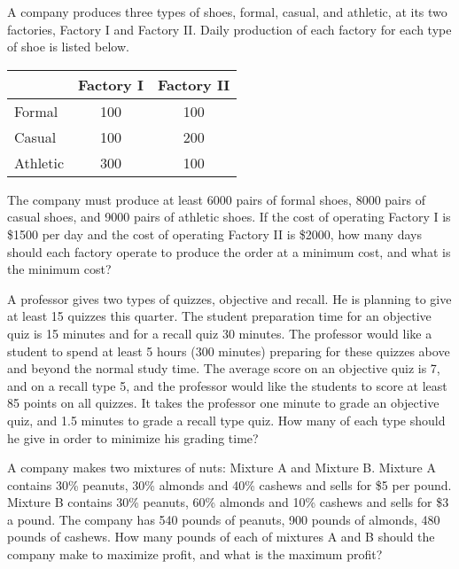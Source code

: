 \begin{puzzle}
    A company produces three types of shoes, formal, casual, and athletic, at its two factories, Factory I and Factory II. Daily production of each factory for each type of shoe is listed below.
    \begin{center}
        \begin{tabular}{|l|c|c|}
            \hline
                     & Factory I & Factory II \\
            \hline
            Formal   & 100       & 100        \\
            \hline
            Casual   & 100       & 200        \\
            \hline
            Athletic & 300       & 100        \\
            \hline
        \end{tabular}

    \end{center}
    The company must produce at least 6000 pairs of formal shoes, 8000 pairs of casual shoes, and 9000 pairs of athletic shoes. If the cost of operating Factory I is \$1500 per day and the cost of operating Factory II is \$2000, how many days should each factory operate to produce the order at a minimum cost, and what is the minimum cost?
\end{puzzle}

\begin{puzzle}
    A professor gives two types of quizzes, objective and recall. He is planning to give at least 15
    quizzes this quarter. The student preparation time for an objective quiz is 15 minutes and for a
    recall quiz 30 minutes. The professor would like a student to spend at least 5 hours (300 minutes)
    preparing for these quizzes above and beyond the normal study time. The average score on an
    objective quiz is 7, and on a recall type 5, and the professor would like the students to score at
    least 85 points on all quizzes. It takes the professor one minute to grade an objective quiz, and 1.5
    minutes to grade a recall type quiz. How many of each type should he give in order to minimize
    his grading time?
\end{puzzle}

\begin{puzzle}
    A company makes two mixtures of nuts: Mixture A and Mixture B. Mixture A contains 30\%
    peanuts, 30\% almonds and 40\% cashews and sells for \$5 per pound. Mixture B contains 30\%
    peanuts, 60\% almonds and 10\% cashews and sells for \$3 a pound. The company has 540 pounds
    of peanuts, 900 pounds of almonds, 480 pounds of cashews. How many pounds of each of mixtures
    A and B should the company make to maximize profit, and what is the maximum profit?
\end{puzzle}
